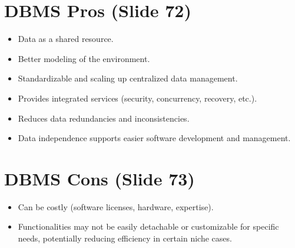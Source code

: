 \documentclass{article}
\begin{document}
	\section{DBMS Pros (Slide 72)}
	\begin{itemize}
		\item Data as a shared resource.
		\item Better modeling of the environment.
		\item Standardizable and scaling up centralized data management.
		\item Provides integrated services (security, concurrency, recovery, etc.).
		\item Reduces data redundancies and inconsistencies.
		\item Data independence supports easier software development and management.
	\end{itemize}
	
	\section{DBMS Cons (Slide 73)}
	\begin{itemize}
		\item Can be costly (software licenses, hardware, expertise).
		\item Functionalities may not be easily detachable or customizable for specific needs, potentially reducing efficiency in certain niche cases.
	\end{itemize}
	
\end{document}
